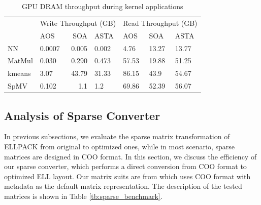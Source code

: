 \documentclass[10pt,journal,compsoc]{IEEEtran}
\begin{document}
\begin{table}[]
\renewcommand{\arraystretch}{1.3}
\centering
\caption{GPU DRAM throughput during kernel applications }
\label{tb:DRAM_throughput}
\begin{tabular}{|l|l|r|l|l|l|l|}
\hline
\multicolumn{1}{|c|}{\multirow{2}{*}{}} & \multicolumn{3}{l|}{Write Throughput (GB)} & \multicolumn{3}{l|}{Read Throughput (GB)} \\ \cline{2-7}
\multicolumn{1}{|c|}{}                  & AOS           & SOA          & ASTA        & AOS          & SOA          & ASTA        \\ \hline \hline
NN                                      & 0.0007        & 0.005        & 0.002       & 4.76         & 13.27        & 13.77       \\ \hline
MatMul                                  & 0.030         & 0.290        & 0.473       & 57.53        & 19.88        & 51.25       \\ \hline
kmeans                                  & 3.07          & 43.79        & 31.33       & 86.15        & 43.9         & 54.67       \\ \hline
SpMV                                    & 0.102         & 1.1          & 1.2         & 69.86        & 52.39        & 56.07       \\ \hline
\end{tabular}
\end{table}



\subsection{Analysis of Sparse Converter}
In previous subsections, we evaluate the sparse matrix transformation of ELLPACK from original to optimized ones, while in most scenario, sparse matrices are designed in COO format. In this section, we discuss the efficiency of our sparse converter, which performs a direct conversion from COO format to optimized ELL layout.
Our matrix suits are from \cite{matrix_market} which uses COO format with metadata as the default matrix representation.
The description of the tested matrices is shown in Table  \ref{tb:sparse_benchmark}.
\end{document}
